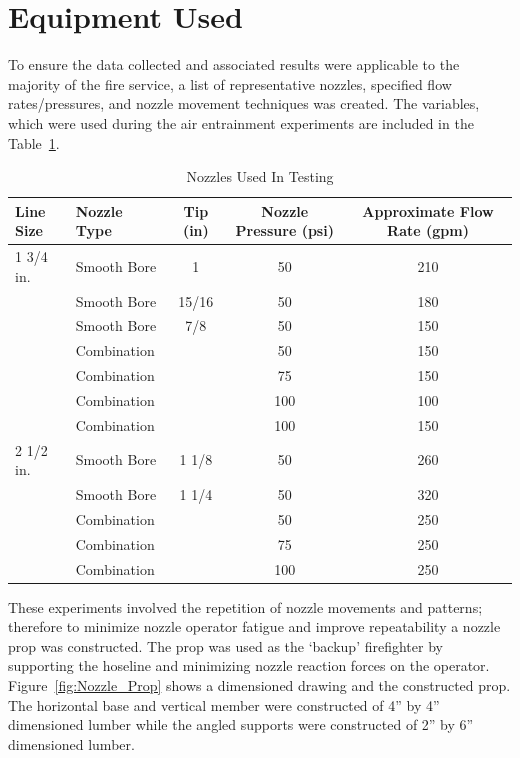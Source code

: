 \documentclass[12pt,oneside]{book}
\begin{document}
\clearpage

\section{Equipment Used}

To ensure the data collected and associated results were applicable to the majority of the fire service, a list of representative nozzles, specified flow rates/pressures, and nozzle movement techniques was created. The variables, which were used during the air entrainment experiments are included in the Table~\ref{tab:Nozzle Selection}.

\begin{table}[!ht]
\centering
\caption{Nozzles Used In Testing}\label{tab:Nozzle Selection}
\begin{tabular}{llccc}
\toprule[1.5pt]
Line Size & Nozzle Type & Tip (in)& Nozzle Pressure (psi) & Approximate Flow Rate (gpm) \\
\midrule
1 3/4 in. & Smooth Bore & 1     & 50  & 210 \\
          & Smooth Bore & 15/16 & 50  & 180 \\
          & Smooth Bore & 7/8   & 50  & 150 \\
          & Combination &       & 50  & 150 \\
          & Combination &       & 75  & 150 \\
          & Combination &       & 100 & 100 \\
          & Combination &       & 100 & 150 \\
\midrule
2 1/2 in. & Smooth Bore & 1 1/8 & 50  & 260 \\
          & Smooth Bore & 1 1/4 & 50  & 320 \\
          & Combination &       & 50  & 250 \\ 
          & Combination &       & 75  & 250 \\
          & Combination &       & 100 & 250 \\
\bottomrule[1.25pt]
\end{tabular}
\end{table}

These experiments involved the repetition of nozzle movements and patterns; therefore to minimize nozzle operator fatigue and improve repeatability a nozzle prop was constructed. The prop was used as the `backup' firefighter by supporting the hoseline and minimizing nozzle reaction forces on the operator. Figure~\ref{fig:Nozzle_Prop} shows a dimensioned drawing and the constructed prop. The horizontal base and vertical member were constructed of 4'' by 4'' dimensioned lumber while the angled supports were constructed of 2'' by 6'' dimensioned lumber.
\end{document}
